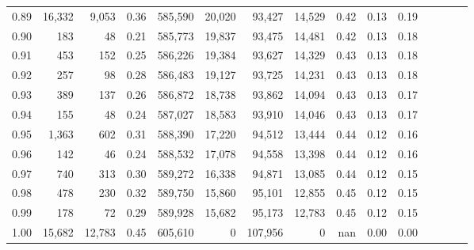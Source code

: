 \begin{tabular}{rrrcrrrrrrrrrrr}
0.89 &  16,332 &   9,053 &                                       0.36 &  585,590 &   20,020 &   93,427 &   14,529 &  0.42 &  0.13 &                         0.19 \\
0.90 &     183 &      48 &                                       0.21 &  585,773 &   19,837 &   93,475 &   14,481 &  0.42 &  0.13 &                         0.18 \\
0.91 &     453 &     152 &                                       0.25 &  586,226 &   19,384 &   93,627 &   14,329 &  0.43 &  0.13 &                         0.18 \\
0.92 &     257 &      98 &                                       0.28 &  586,483 &   19,127 &   93,725 &   14,231 &  0.43 &  0.13 &                         0.18 \\
0.93 &     389 &     137 &                                       0.26 &  586,872 &   18,738 &   93,862 &   14,094 &  0.43 &  0.13 &                         0.17 \\
0.94 &     155 &      48 &                                       0.24 &  587,027 &   18,583 &   93,910 &   14,046 &  0.43 &  0.13 &                         0.17 \\
0.95 &   1,363 &     602 &                                       0.31 &  588,390 &   17,220 &   94,512 &   13,444 &  0.44 &  0.12 &                         0.16 \\
0.96 &     142 &      46 &                                       0.24 &  588,532 &   17,078 &   94,558 &   13,398 &  0.44 &  0.12 &                         0.16 \\
0.97 &     740 &     313 &                                       0.30 &  589,272 &   16,338 &   94,871 &   13,085 &  0.44 &  0.12 &                         0.15 \\
0.98 &     478 &     230 &                                       0.32 &  589,750 &   15,860 &   95,101 &   12,855 &  0.45 &  0.12 &                         0.15 \\
0.99 &     178 &      72 &                                       0.29 &  589,928 &   15,682 &   95,173 &   12,783 &  0.45 &  0.12 &                         0.15 \\
1.00 &  15,682 &  12,783 &                                       0.45 &  605,610 &        0 &  107,956 &        0 &   nan &  0.00 &                         0.00 \\
\bottomrule
\end{tabular}
